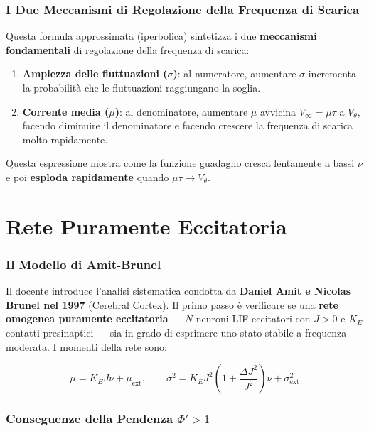 \subsubsection{I Due Meccanismi di Regolazione della Frequenza di Scarica}

Questa formula approssimata (iperbolica) sintetizza i due \textbf{meccanismi fondamentali} di regolazione della frequenza di scarica:
\begin{enumerate}
    \item \textbf{Ampiezza delle fluttuazioni ($\sigma$)}: al numeratore, aumentare $\sigma$ incrementa la probabilità che le fluttuazioni raggiungano la soglia.
    \item \textbf{Corrente media ($\mu$)}: al denominatore, aumentare $\mu$ avvicina $V_\infty = \mu\tau$ a $V_\theta$, facendo diminuire il denominatore e facendo crescere la frequenza di scarica molto rapidamente.
\end{enumerate}

Questa espressione mostra come la funzione guadagno cresca lentamente a bassi $\nu$ e poi \textbf{esploda rapidamente} quando $\mu\tau \to V_\theta$.

\section{Rete Puramente Eccitatoria}

\subsubsection{Il Modello di Amit-Brunel}

Il docente introduce l'analisi sistematica condotta da \textbf{Daniel Amit e Nicolas Brunel nel 1997} (Cerebral Cortex). Il primo passo è verificare se una \textbf{rete omogenea puramente eccitatoria} — $N$ neuroni LIF eccitatori con $J > 0$ e $K_E$ contatti presinaptici — sia in grado di esprimere uno stato stabile a frequenza moderata. I momenti della rete sono:

\begin{equation}
\mu = K_E J \nu + \mu_{\text{ext}}, \qquad \sigma^2 = K_E J^2\!\left(1 + \frac{\Delta J^2}{J^2}\right)\!\nu + \sigma^2_{\text{ext}}
\end{equation}

\subsubsection{Conseguenze della Pendenza $\Phi' > 1$}

